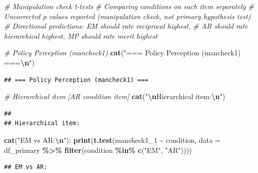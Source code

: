 \documentclass[
]{article}
\newenvironment{Shaded}{\begin{snugshade}}{\end{snugshade}}
\newcommand{\AttributeTok}[1]{\textcolor[rgb]{0.13,0.29,0.53}{#1}}
\newcommand{\CommentTok}[1]{\textcolor[rgb]{0.56,0.35,0.01}{\textit{#1}}}
\newcommand{\FunctionTok}[1]{\textcolor[rgb]{0.13,0.29,0.53}{\textbf{#1}}}
\newcommand{\NormalTok}[1]{#1}
\newcommand{\SpecialCharTok}[1]{\textcolor[rgb]{0.81,0.36,0.00}{\textbf{#1}}}
\newcommand{\StringTok}[1]{\textcolor[rgb]{0.31,0.60,0.02}{#1}}
\begin{document}
\begin{Shaded}
\begin{Highlighting}[]
\CommentTok{\# Manipulation check t{-}tests}
\CommentTok{\# Comparing conditions on each item separately}
\CommentTok{\# Uncorrected p values reported (manipulation check, not primary hypothesis test)}
\CommentTok{\# Directional predictions: EM should rate reciprocal highest,}
\CommentTok{\# AR should rate hierarchical highest, MP should rate merit highest}

\CommentTok{\# Policy Perception (mancheck1)}
\FunctionTok{cat}\NormalTok{(}\StringTok{"=== Policy Perception (mancheck1) ===}\SpecialCharTok{\textbackslash{}n}\StringTok{"}\NormalTok{)}
\end{Highlighting}
\end{Shaded}

\begin{verbatim}
## === Policy Perception (mancheck1) ===
\end{verbatim}

\begin{Shaded}
\begin{Highlighting}[]
\CommentTok{\# Hierarchical item [AR condition item]}
\FunctionTok{cat}\NormalTok{(}\StringTok{"}\SpecialCharTok{\textbackslash{}n}\StringTok{Hierarchical item:}\SpecialCharTok{\textbackslash{}n}\StringTok{"}\NormalTok{)}
\end{Highlighting}
\end{Shaded}

\begin{verbatim}
## 
## Hierarchical item:
\end{verbatim}

\begin{Shaded}
\begin{Highlighting}[]
\FunctionTok{cat}\NormalTok{(}\StringTok{"EM vs AR:}\SpecialCharTok{\textbackslash{}n}\StringTok{"}\NormalTok{); }\FunctionTok{print}\NormalTok{(}\FunctionTok{t.test}\NormalTok{(mancheck1\_1 }\SpecialCharTok{\textasciitilde{}}\NormalTok{ condition, }
       \AttributeTok{data =}\NormalTok{ df\_primary }\SpecialCharTok{\%\textgreater{}\%} \FunctionTok{filter}\NormalTok{(condition }\SpecialCharTok{\%in\%} \FunctionTok{c}\NormalTok{(}\StringTok{"EM"}\NormalTok{, }\StringTok{"AR"}\NormalTok{))))}
\end{Highlighting}
\end{Shaded}

\begin{verbatim}
## EM vs AR:
\end{verbatim}
\end{document}
